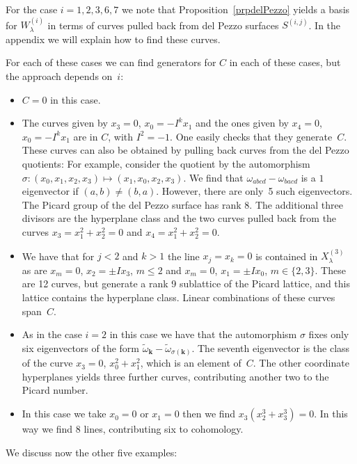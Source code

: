 \documentclass[pdftex]{sigma}
\numberwithin{equation}{section}
\begin{document}
\begin{Example} For the case $i=1,2,3,6,7$ we note that Proposition~\ref{prpdelPezzo} yields a basis for $W^{(i)}_\lambda$ in terms of curves pulled back from del Pezzo surfaces $S^{(i,j)}$. In the appendix we will explain how to f\/ind these curves.

For each of these cases we can f\/ind generators for $C$ in each of these cases, but the approach depends on~$i$:
\begin{itemize}\itemsep=0pt
\item[$i=1$] $C=0$ in this case.
\item[$i=2$] The curves given by $x_3=0$, $x_0=-I^k x_1$ and the ones given by $x_4=0$, $x_0=-I^kx_1$ are in $C$, with $I^2=-1$. One easily checks that they generate~$C$. These curves can also be obtained by pulling back curves from the del Pezzo quotients: For example, consider the quotient by the automorphism $\sigma\colon (x_0,x_1,x_2,x_3)\mapsto (x_1,x_0,x_2,x_3)$. We f\/ind that $\omega_{abcd}-\omega_{bacd}$ is a $1$ eigenvector if $(a,b)\neq (b,a)$. However, there are only~5 such eigenvectors. The Picard group of the del Pezzo surface has rank 8. The additional three divisors are the hyperplane class and the two curves pulled back from the curves $x_3=x_1^2+x_2^2=0$ and $x_4=x_1^2+x_2^2=0$.
\item[$i=3$] We have that for $j<2$ and $k>1$ the line $x_j=x_k=0$ is contained in $X_{\lambda}^{(3)}$ as are $x_m=0$, $x_2=\pm I x_3$, $m \leq 2$ and $x_m=0$, $x_1=\pm I x_0$, $m\in \{2,3\}$. These are 12 curves, but generate a rank 9 sublattice of the Picard lattice, and this lattice contains the hyperplane class. Linear combinations of these curves span~$C$.
 \item[$i=6$] As in the case $i=2$ in this case we have that the automorphism $\sigma$ f\/ixes only six eigenvectors of the form $\tilde{\omega}_{\mathbf{k}}-\tilde{\omega}_{\sigma(\mathbf{k})}$. The seventh eigenvector is the class of the curve $x_3=0$, $x_0^2+x_1^2$, which is an element of~$C$. The other coordinate hyperplanes yields three further curves, contributing another two to the Picard number.
\item[$i=7$] In this case we take $x_0=0$ or $x_1=0$ then we f\/ind $x_3(x_2^3+x_3^3)=0$. In this way we f\/ind 8 lines, contributing six to cohomology.
\end{itemize}
\end{Example}

 We discuss now the other f\/ive examples:
\end{document}
